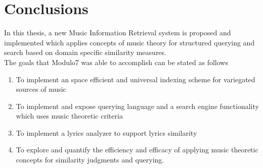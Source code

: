 \chapter{Conclusions}

\noindent In this thesis, a new Music Information Retrieval system is proposed and implemented which applies concepts of music theory for structured querying and search based on domain specific similarity measures. \\

\noindent The goals that Modulo7 was able to accomplish can be stated as follows
\begin{enumerate}
\item To implement an space efficient and universal indexing scheme for variegated sources of music 
\item To implement and expose querying language and a search engine functionality which uses music theoretic criteria
\item To implement a lyrics analyzer to support lyrics similarity  
\item To explore and quantify the efficiency and efficacy of applying music theoretic concepts for similarity judgments and querying.
\end{enumerate} 

